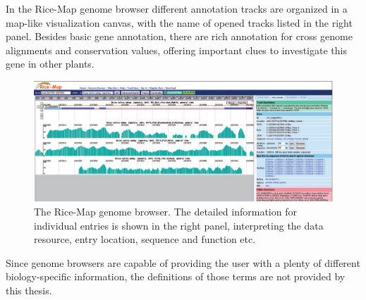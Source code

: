 In the Rice-Map genome browser different annotation tracks are organized in a map-like visualization canvas, with the name of opened tracks listed in the right panel. 
Besides basic gene annotation, there are rich annotation for cross genome alignments and conservation values, offering important clues to investigate this gene in other plants.

\begin{figure}[!ht]
	\centering
	\includegraphics[width=.9\textwidth]{figures/ss-2.png}
	\caption{The Rice-Map genome browser. The detailed information for individual entries is shown in the right panel, interpreting the data resource, entry location, sequence and function etc.\label{o:latex_friendly_zone}}
\end{figure}

Since genome browsers are capable of providing the user with a plenty of different biology-specific information, the definitions of those terms are not provided by this thesis.